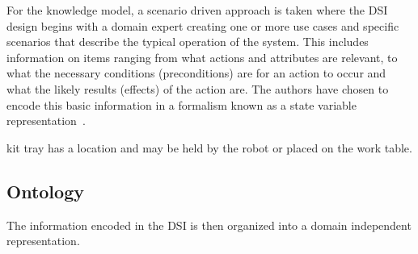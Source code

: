 For the knowledge model, a scenario driven approach is taken where the DSI design begins with a domain expert creating one or more use cases and specific scenarios that describe the typical operation of the system. This includes information on items ranging from what actions and attributes are relevant, to what the necessary conditions (preconditions) are for an action to occur and what the likely results (effects) of the action are. The authors have chosen to encode this basic information in a formalism known as a state variable representation~\cite{NAU.2004}.


kit tray has a location and may be held by the robot or placed on the work table.

\subsection{Ontology}
\label{subsection:ontology}
The information encoded in the DSI is then organized into a domain
independent representation.

